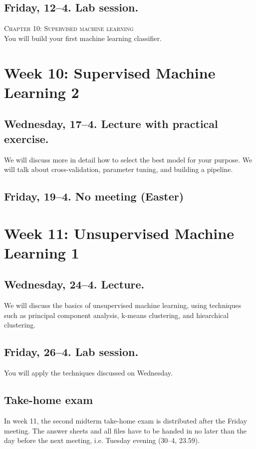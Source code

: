 \documentclass[a4paper,10pt]{report}
\begin{document}
\subsection*{Friday, 12--4. Lab session.}
\textsc{ Chapter 10: Supervised machine learning}\\
You will build your first machine learning classifier.



\section*{Week 10: Supervised Machine Learning 2}

\subsection*{Wednesday, 17--4. Lecture with practical exercise.}
We will discuss more in detail how to select the best model for your purpose. We will talk about cross-validation, parameter tuning, and building a pipeline.

\subsection*{Friday, 19--4. No meeting (Easter)}




\section*{Week 11: Unsupervised Machine Learning 1}

\subsection*{Wednesday, 24--4. Lecture.}
We will discuss the basics of unsupervised machine learning, using techniques such as principal component analysis, k-means clustering, and hiearchical clustering.

\subsection*{Friday, 26--4. Lab session.}
You will apply the techniques discussed on Wednesday.


\subsection*{Take-home exam}
In week 11, the second midterm take-home exam is distributed after the Friday meeting. The answer sheets and all files have to be handed in no later than the day before the next meeting, i.e. Tuesday evening (30--4, 23.59).
\end{document}
